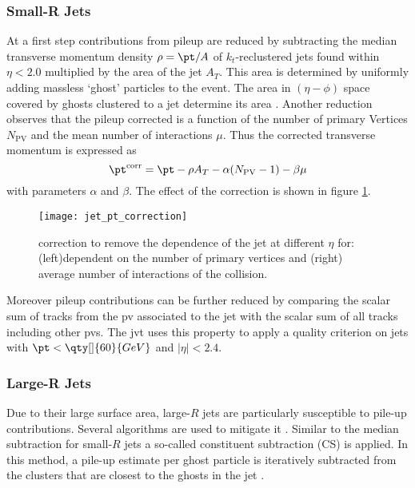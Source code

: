 \subsubsection{Small-R Jets}
At a first step contributions from pileup are reduced by subtracting the median transverse momentum density $\rho=\pt / A$ of $k_t$-reclustered jets found within $\eta<2.0$ multiplied by the area of the jet $A_T$. This area is determined by uniformly adding massless `ghost' particles to the event. The area in $(\eta-\phi)$ space covered by ghosts clustered to a jet determine its area \citep{ATLAS-CONF-2017-065}. Another reduction observes that the pileup corrected \pt is a function of the number of primary Vertices $N_\text{PV}$ and the mean number of interactions $\mu$. Thus the corrected transverse momentum is expressed as
\begin{equation}
  \pt^\text{corr}=\pt-\rho A_T -\alpha(N_\text{PV}-1)-\beta\mu
\end{equation}
with parameters $\alpha$ and $\beta$. The effect of the correction is shown in figure \ref{fig:jet_pt_correction}.
\begin{figure}
  \centering
  \texttt{[image: jet\_pt\_correction]}
  \caption[]{\pt correction to remove the \pt dependence of the jet at different $\eta$ for: (left)\pt dependent on the number of primary vertices and (right) average number of interactions of the collision.}
  \label{fig:jet_pt_correction}
\end{figure}

Moreover pileup contributions can be further reduced by comparing the scalar \pt sum of tracks from the \ac{pv} associated to the jet with the scalar \pt sum of all tracks including other \acp{pv}. The \ac{jvt} \citep{ATLAS-CONF-2014-018} uses this property to apply a quality criterion on jets with $\pt<\qty[]{60}{GeV}$ and $|\eta|<2.4$.


\subsubsection{Large-R Jets}
Due to their large surface area, large-$R$ jets are particularly susceptible to pile-up contributions. Several algorithms are used to mitigate it \citep{atlas2021optimisation}. Similar to the median \pt subtraction for small-$R$ jets a so-called constituent subtraction (CS) is applied. In this method, a pile-up estimate per ghost particle is iteratively subtracted from the clusters that are closest to the ghosts in the jet \citep{ATLAS-CONF-2017-065}.

